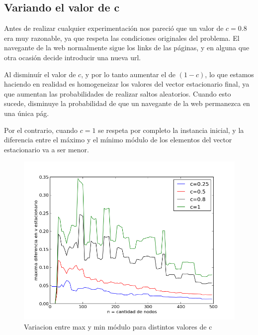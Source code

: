 \subsection{Variando el valor de c}

Antes de realizar cualquier experimentación nos pareció que un valor de $c=0.8$ era muy razonable, ya que respeta las condiciones
originales del problema. El navegante de la web normalmente sigue los links de las páginas, y en alguna que otra ocasión decide
introducir una nueva url.

Al disminuír el valor de $c$, y por lo tanto aumentar el de $(1-c)$, lo que estamos haciendo en realidad es homogeneizar los valores
del vector estacionario final, ya que aumentan las probabilidades de realizar saltos aleatorios. Cuando esto sucede, disminuye
la probabilidad de que un navegante de la web permanezca en una única pág.

Por el contrario, cuando $c=1$ se respeta por completo la instancia inicial, y la diferencia entre el máximo y el mínimo módulo
de los elementos del vector estacionario va a ser menor.

\begin{figure}[!h]
        \begin{center}
                  \includegraphics[scale = 0.6]{graficos/variando_c.png}
                  \caption{Variacion entre max y min módulo para distintos valores de c}
                  \label{fig:contra1}
        \end{center}
\end{figure}
\FloatBarrier
